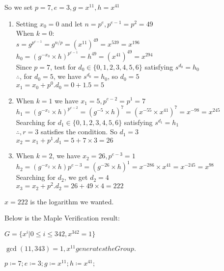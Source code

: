 \documentclass[11pt,a4paper,fleqn]{article}
\begin{document}
\begin{enumerate}[1.]
\begin{flushleft}
\begin{enumerate}
				So we set $p = 7, e = 3, g = x^{11}, h = x^{41}$
				\begin{enumerate}[Step 1.]
					\item Setting $x_0 = 0$ and let $n = p^e, p^{e-1} = p^2 = 49 $\\
					When $k = 0$:\\
					$s = g^{p^{e-1}} = g^{n/p} = (x^{11})^{49} = x^{539} = x^{196}$\\
					$h_0 = (g^{-x_0} \times h)^{p^{e-1}} = h^{49} = (x^{41})^{49} = x^{294}$ \\
					Since $p = 7$, test for $d_0 \in \{0, 1, 2, 3, 4, 5, 6\}$ satisfying $s^{d_0} = h_0$\\
					$\therefore$, for $d_0 = 5$, we have $s^{d_0} = h_0$, so $d_0 = 5$\\
					$x_1 = x_0 + p^0.d_0 = 0 + 1.5 = 5$
					\item When $k = 1$ we have $x_1 = 5, p^{e-2} = p^1 = 7$\\
					$h_1 = (g^{-x_1}\times h)^{p^{e-2}} = (g^{-5}\times h)^7 = (x^{-55} \times x^{41})^7 = x^{-98} = x^{245}$\\
					Searching for $d_1 \in \{0, 1, 2, 3, 4, 5, 6\}$ satisfying $s^{d_1} = h_1$\\
					$\therefore, r = 3$ satisfies the condition. So $d_1 = 3$\\
					$x_2 = x_1 + p^1.d_1 = 5 + 7 \times 3 = 26$\\
					\item When $k = 2$, we have $x_2 = 26, p^{e-3} = 1$\\
					$h_2 = (g^{-x_2} \times h)p^{e-3} = (g^{-26} \times h)^1 = x^{-286} \times x^{41} = x^{-245} = x^{98}$\\
					Searching for $d_2$, we get $d_2 = 4$\\
					$x_3 = x_2 + p^2.d_2 = 26 + 49 \times 4 = 222$  
				\end{enumerate}
				$x = 222$ is the logarithm we wanted.
			\end{enumerate}
			
			\bigbreak
			Below is the Maple Verification result:
			\begin{mdframed}

			\begin{Maple Normal}
				{$ \displaystyle G ={\{x^{i}| 0\le i \le 342,x^{342}=1\}} $}
			\end{Maple Normal}
			\begin{Maple Normal}
				{$ \displaystyle \gcd (11,343)=1,x^{11}\mathit{generates} \mathit{the} \mathit{Group} . $}
			\end{Maple Normal}
			\mapleinput
			{$ \displaystyle p \coloneqq 7;e \coloneqq 3;g \coloneqq x^{11};h \coloneqq x^{41}; $}
			

\end{mdframed}
\end{flushleft}
\end{enumerate}
\end{document}
